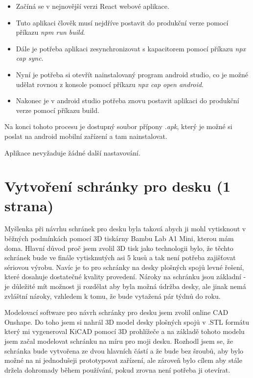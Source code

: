 \begin{itemize}
    \item Začíná se v nejnovější verzi React webové aplikace.
    \item Tuto aplikaci člověk musí nejdříve postavit do produkční verze pomocí příkazu \textit{npm run build}.
    \item Dále je potřeba aplikaci zesynchronizovat s kapacitorem pomocí příkazu \textit{npx cap sync}.
    \item Nyní je potřeba si otevřít nainstalovaný program android studio, co je možné udělat rovnou z konsole pomocí příkazu \textit{npx cap open android}.
    \item Nakonec je v android studio potřeba znovu postavit aplikaci do produkční verze pomocí příkazu build.
\end{itemize}

Na konci tohoto procesu je dostupný soubor přípony \textit{.apk}, který je možné si poslat na android mobilní zařízení a tam nainstalovat.

Aplikace nevyžaduje žádné další nastavování.

\section{Vytvoření schránky pro desku (1 strana)}

Myšlenka při návrhu schránek pro desku byla taková abych ji mohl vytisknout v běžných podmínkách pomocí 3D tiskárny Bambu Lab A1 Mini, kterou mám doma. Hlavní důvod proč jsem zvolil 3D tisk jako technologii bylo, že těchto schránek bude ve finále vytisknutých asi 5 kusů a tak není potřeba zajišťovat sériovou výrobu. Navíc je to pro schránky na desky plošných spojů levné řešení, které dosahuje dostatečné kvality provedení. Nároky na schránku jsou základní - je důležité mít možnost ji rozdělat aby byla možná údržba desky, ale jinak nemá zvláštní nároky, vzhledem k tomu, že bude vytažená pár týdnů do roku.

Modelovací software pro návrh schránky pro desku jsem zvolil online CAD Onshape. Do toho jsem si nahrál 3D model desky plošných spojů v .STL formátu který mi vygeneroval KiCAD pomocí 3D prohlížeče a na základě tohoto modelu jsem začal modelovat schránku na míru pro moji desku. Rozhodl jsem se, že schránka bude vytvořena ze dvou hlavních částí a že bude bez šroubů, aby bylo možné na ni jednodušeji prototypovat zařízení, ale zároveň bylo cílem aby stále držela dohromady během používání, pokud zrovna není potřeba ji otevírat.

